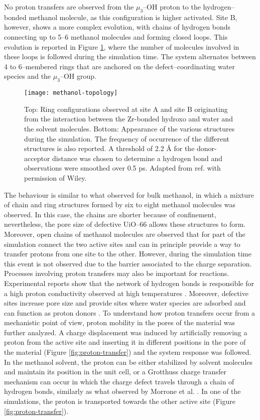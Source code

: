 \npar
No proton transfers are observed from the $\mu_3$--OH proton to the hydrogen--bonded methanol molecule, as this configuration is higher activated. Site B, however, shows a more complex evolution, with chains of hydrogen bonds connecting up to 5--6 methanol molecules and forming closed loops. This evolution is reported in Figure \ref{fig:methanol-topology}, where the number of molecules involved in these loops is followed during the simulation time. The system alternates between 4 to 6--membered rings that are anchored on the defect--coordinating water species and the $\mu_3$--OH group. 
\npar
\begin{figure}[!htb]
	\centering
	\texttt{[image: methanol-topology]}
	\caption{Top: Ring configurations observed at site A and site B originating from the interaction between the Zr-bonded hydroxo and water and the solvent molecules. Bottom: Appearance of the various structures during the simulation. The frequency of occurrence of the different structures is also reported. A threshold of 2.2 Å for the donor-acceptor distance was chosen to determine a hydrogen bond and observations were smoothed over 0.5 ps.  Adapted from ref. \cite{caratelli2018influence} with permission of Wiley.}
	\label{fig:methanol-topology}
\end{figure}
The behaviour is similar to what observed for bulk methanol\cite{kashtanov2005chemical, pagliai2003hydrogen, morrone2002ab}, in which a mixture of chain and ring structures formed by six to eight methanol molecules was observed. In this case, the chains are shorter because of confinement, nevertheless, the pore size of defective UiO--66 allows these structures to form. Moreover, open chains of methanol molecules are observed that for part of the simulation connect the two active sites and can in principle provide a way to transfer protons from one site to the other. However, during the simulation time this event is not observed due to the barrier associated to the charge separation. 
\npar
Processes involving proton transfers may also be important for reactions. Experimental reports show that the network of hydrogen bonds is responsible for a high proton conductivity observed at high temperatures \cite{borges2016proton}. Moreover, defective sites increase pore size and provide sites where water species are adsorbed and can function as proton donors \cite{taylor2015defect}. To understand how proton transfers occur from a mechanistic point of view, proton mobility in the pores of the material was further analyzed. A charge displacement was induced by artificially removing a proton from the active site and inserting it in different positions in the pore of the material (Figure \ref{fig:proton-transfer}) and the system response was followed. In the methanol solvent, the proton can be either stabilized by solvent molecules and maintain its position in the unit cell, or a Grotthuss charge transfer mechanism can occur in which the charge defect travels through a chain of hydrogen bonds, similarly as what observed by Morrone et al. \cite{morrone2002ab}. In one of the simulations, the proton is transported towards the other active site (Figure \ref{fig:proton-transfer}). 
